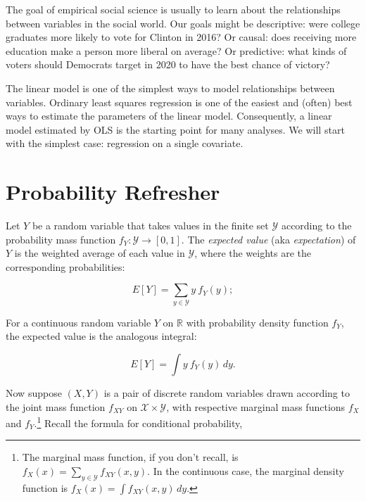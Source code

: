 \documentclass[12pt,oneside,openany]{book}
\begin{document}
\providecommand{\SSE}{\mathop{\rm SSE}\nolimits}
\providecommand{\RSS}{\mathop{\rm RSS}\nolimits}
\providecommand{\TSS}{\mathop{\rm TSS}\nolimits}
\providecommand{\Cov}{\mathop{\rm Cov}\nolimits}
\providecommand{\pderiv}[2]{\frac{\partial{}#1}{\partial{}#2}}

The goal of empirical social science is usually to learn about the
relationships between variables in the social world. Our goals might be
descriptive: were college graduates more likely to vote for Clinton in
2016? Or causal: does receiving more education make a person more
liberal on average? Or predictive: what kinds of voters should Democrats
target in 2020 to have the best chance of victory?

The linear model is one of the simplest ways to model relationships
between variables. Ordinary least squares regression is one of the
easiest and (often) best ways to estimate the parameters of the linear
model. Consequently, a linear model estimated by OLS is the starting
point for many analyses. We will start with the simplest case:
regression on a single covariate.

\section{Probability Refresher}\label{probability}

Let \(Y\) be a random variable that takes values in the finite set
\(\mathcal{Y}\) according to the probability mass function
\(f_Y : \mathcal{Y} \to [0, 1]\). The \emph{expected value} (aka
\emph{expectation}) of \(Y\) is the weighted average of each value in
\(\mathcal{Y}\), where the weights are the corresponding probabilities:

\begin{equation}
E[Y] = \sum_{y \in \mathcal{Y}} y \: f_Y(y);
\end{equation}

For a continuous random variable \(Y\) on \(\mathbb{R}\) with
probability density function \(f_Y\), the expected value is the
analogous integral:

\begin{equation}
E[Y] = \int y \: f_Y(y) \, dy.
\end{equation}

Now suppose \((X, Y)\) is a pair of discrete random variables drawn
according to the joint mass function \(f_{XY}\) on
\(\mathcal{X} \times \mathcal{Y}\), with respective marginal mass
functions \(f_X\) and \(f_Y\).\footnote{The marginal mass function, if
  you don't recall, is
  \(f_X(x) = \sum_{y \in \mathcal{Y}} f_{XY} (x, y)\). In the continuous
  case, the marginal density function is
  \(f_X(x) = \int f_{XY} (x, y) \, dy\).} Recall the formula for
conditional probability,
\end{document}
